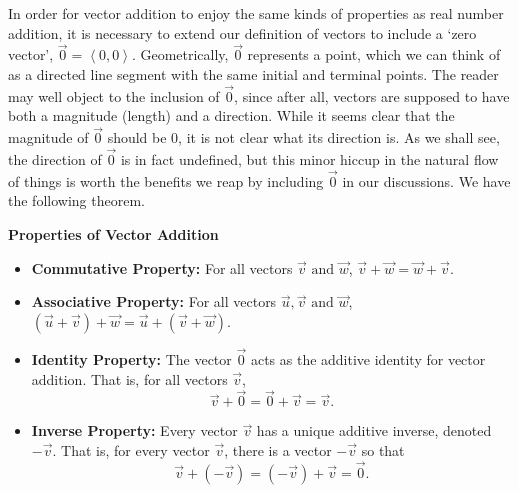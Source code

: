 In order for vector addition to enjoy the same kinds of properties as real number addition, it is necessary to extend our definition of vectors to include a `zero vector', $\vec{0} = \left<0, 0\right>$.  Geometrically,  $\vec{0}$ represents a point, which we can think of as a directed line segment with the same initial and terminal points.  The reader may well object to the inclusion of $\vec{0}$, since after all, vectors are supposed to have both a magnitude (length) and a direction.  While it seems clear that the magnitude of $\vec{0}$ should be $0$, it is not clear what its direction is.  As we shall see, the direction of $\vec{0}$ is in fact undefined, but this minor hiccup in the natural flow of things is worth the benefits we reap by including $\vec{0}$ in our discussions.  We have the following theorem.

\medskip

\colorbox{ResultColor}{\bbm
\begin{thm} \label{vectoradditionprops}  \textbf{Properties of Vector Addition} 
\begin{itemize}

\item  \textbf{Commutative Property:}  For all vectors $\vec{v} \text{ and } \vec{w}$, $\vec{v} + \vec{w} = \vec{w} + \vec{v}$. 

\item  \textbf{Associative Property:}  For all vectors $\vec{u}, \vec{v} \text{ and } \vec{w}$, $\left(\vec{u} + \vec{v}\right) + \vec{w} = \vec{u} + \left(\vec{v} + \vec{w}\right)$. 

\item  \textbf{Identity Property:}  The vector $\vec{0}$ acts as the additive identity for vector addition.  That is, for all vectors $\vec{v}$,  \[\vec{v} + \vec{0} = \vec{0} + \vec{v} = \vec{v}.\] 

\item  \textbf{Inverse Property:}   Every vector $\vec{v}$ has a unique additive inverse, denoted $-\vec{v}$.  That is, for every vector $\vec{v}$, there is a vector $-\vec{v}$ so that \[\vec{v} + (-\vec{v}) = (-\vec{v}) + \vec{v} = \vec{0}.\] 

\end{itemize}
\end{thm}
\ebm}

